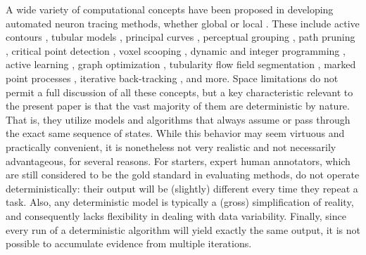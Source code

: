 \documentclass[noinfo,nocrop,final]{bioinfo}
\begin{document}
A wide variety of computational concepts have been proposed in developing automated neuron tracing methods, whether global or local \citep{acciai2016automated}. These include active contours \citep{Cai-2006, wang2011broadly, Luo-2015}, tubular models \citep{Santamaria-2015}, principal curves \citep{Bas-2011, quan2015neurogps}, perceptual grouping \citep{Narayanaswamy-2011}, path pruning \citep{peng2011automatic, xiao2013app2}, critical point detection \citep{Al-Kofahi-2008, Radojevic-2016}, voxel scooping \citep{Rodriguez-2009}, dynamic and integer programming \citep{Zhang-2007, turetken2012automated}, active learning \citep{gala2014active}, graph optimization \citep{turetken2011automated, chothani2011automated}, tubularity flow field segmentation \citep{mukherjee2015tubularity}, marked point processes \citep{basu2016neurite}, iterative back-tracking \citep{liu2016rivulet}, and more. Space limitations do not permit a full discussion of all these concepts, but a key characteristic relevant to the present paper is that the vast majority of them are deterministic by nature. That is, they utilize models and algorithms that always assume or pass through the exact same sequence of states. While this behavior may seem virtuous and practically convenient, it is nonetheless not very realistic and not necessarily advantageous, for several reasons. For starters, expert human annotators, which are still considered to be the gold standard in evaluating methods, do not operate deterministically: their output will be (slightly) different every time they repeat a task. Also, any deterministic model is typically a (gross) simplification of reality, and consequently lacks flexibility in dealing with data variability. Finally, since every run of a deterministic algorithm will yield exactly the same output, it is not possible to accumulate evidence from multiple iterations.
\end{document}
